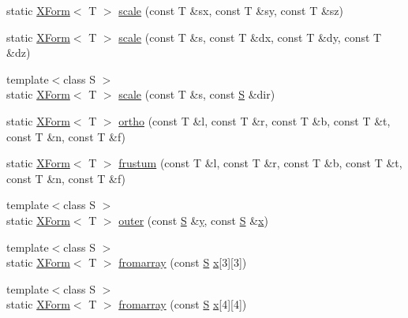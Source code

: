 \begin{DoxyCompactItemize}
static \hyperlink{classtrimesh_1_1XForm}{X\+Form}$<$ T $>$ \hyperlink{classtrimesh_1_1XForm_ab620bf599d233b8fed4e14f593fd9274}{scale} (const T \&sx, const T \&sy, const T \&sz)
\item 
static \hyperlink{classtrimesh_1_1XForm}{X\+Form}$<$ T $>$ \hyperlink{classtrimesh_1_1XForm_a0c15b5dac9ec268190ba7b1e62f4ec1a}{scale} (const T \&s, const T \&dx, const T \&dy, const T \&dz)
\item 
{\footnotesize template$<$class S $>$ }\\static \hyperlink{classtrimesh_1_1XForm}{X\+Form}$<$ T $>$ \hyperlink{classtrimesh_1_1XForm_ab127af613059fa850b24fbd864f0ab18}{scale} (const T \&s, const \hyperlink{ego_8cc_abde73cd36321648268fb4543509b996a}{S} \&dir)
\item 
static \hyperlink{classtrimesh_1_1XForm}{X\+Form}$<$ T $>$ \hyperlink{classtrimesh_1_1XForm_a0b37576cdcaa04d09ef67cf30001ec99}{ortho} (const T \&l, const T \&r, const T \&b, const T \&t, const T \&n, const T \&f)
\item 
static \hyperlink{classtrimesh_1_1XForm}{X\+Form}$<$ T $>$ \hyperlink{classtrimesh_1_1XForm_ab44ff4f0cc02804ee0915b3930e3c4db}{frustum} (const T \&l, const T \&r, const T \&b, const T \&t, const T \&n, const T \&f)
\item 
{\footnotesize template$<$class S $>$ }\\static \hyperlink{classtrimesh_1_1XForm}{X\+Form}$<$ T $>$ \hyperlink{classtrimesh_1_1XForm_add75d061572109455654f6c396e912c6}{outer} (const \hyperlink{ego_8cc_abde73cd36321648268fb4543509b996a}{S} \&\hyperlink{namespacetrimesh_a56b35d0eb7039be92fcc4867080c7419}{y}, const \hyperlink{ego_8cc_abde73cd36321648268fb4543509b996a}{S} \&\hyperlink{namespacetrimesh_a3365d1b1a1bc5d8e9c844cf589a8c4a8}{x})
\item 
{\footnotesize template$<$class S $>$ }\\static \hyperlink{classtrimesh_1_1XForm}{X\+Form}$<$ T $>$ \hyperlink{classtrimesh_1_1XForm_aff7d15fe843a7cae87d76ea141619f06}{fromarray} (const \hyperlink{ego_8cc_abde73cd36321648268fb4543509b996a}{S} \hyperlink{namespacetrimesh_a3365d1b1a1bc5d8e9c844cf589a8c4a8}{x}\mbox{[}3\mbox{]}\mbox{[}3\mbox{]})
\item 
{\footnotesize template$<$class S $>$ }\\static \hyperlink{classtrimesh_1_1XForm}{X\+Form}$<$ T $>$ \hyperlink{classtrimesh_1_1XForm_a941cd6850d76992566ca3fa09ba89cfd}{fromarray} (const \hyperlink{ego_8cc_abde73cd36321648268fb4543509b996a}{S} \hyperlink{namespacetrimesh_a3365d1b1a1bc5d8e9c844cf589a8c4a8}{x}\mbox{[}4\mbox{]}\mbox{[}4\mbox{]})
\end{DoxyCompactItemize}
